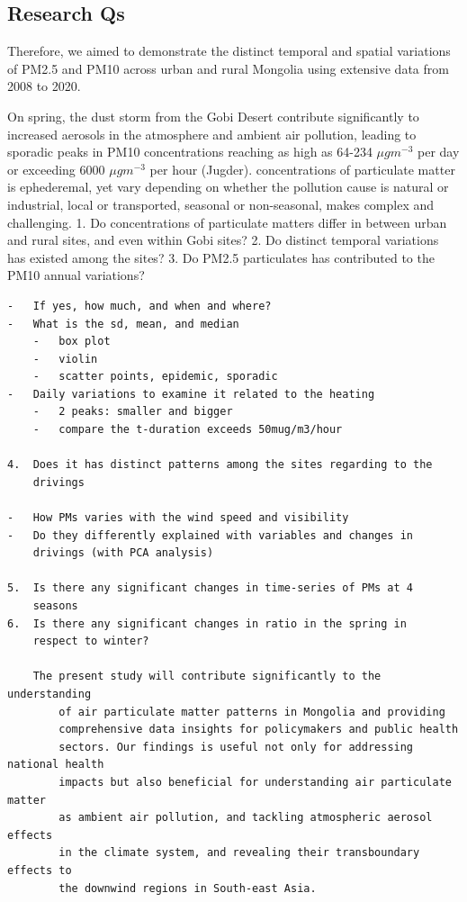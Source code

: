 \documentclass[
  11pt,
]{article}
\begin{document}
\subsection{Research Qs}\label{research-qs}

Therefore, we aimed to demonstrate the distinct temporal and spatial
variations of PM2.5 and PM10 across urban and rural Mongolia using
extensive data from 2008 to 2020.

On spring, the dust storm from the Gobi Desert contribute significantly
to increased aerosols in the atmosphere and ambient air pollution,
leading to sporadic peaks in PM10 concentrations reaching as high as
64-234 \(\mu g m^{-3}\) per day or exceeding 6000 \(\mu g m^{-3}\) per
hour (Jugder). concentrations of particulate matter is ephederemal, yet
vary depending on whether the pollution cause is natural or industrial,
local or transported, seasonal or non-seasonal, makes complex and
challenging. 1. Do concentrations of particulate matters differ in
between urban and rural sites, and even within Gobi sites? 2. Do
distinct temporal variations has existed among the sites? 3. Do PM2.5
particulates has contributed to the PM10 annual variations?

\begin{verbatim}
-   If yes, how much, and when and where?
-   What is the sd, mean, and median
    -   box plot
    -   violin
    -   scatter points, epidemic, sporadic
-   Daily variations to examine it related to the heating
    -   2 peaks: smaller and bigger
    -   compare the t-duration exceeds 50mug/m3/hour

4.  Does it has distinct patterns among the sites regarding to the
    drivings

-   How PMs varies with the wind speed and visibility
-   Do they differently explained with variables and changes in
    drivings (with PCA analysis)

5.  Is there any significant changes in time-series of PMs at 4
    seasons
6.  Is there any significant changes in ratio in the spring in
    respect to winter?

    The present study will contribute significantly to the understanding
        of air particulate matter patterns in Mongolia and providing
        comprehensive data insights for policymakers and public health
        sectors. Our findings is useful not only for addressing national health
        impacts but also beneficial for understanding air particulate matter
        as ambient air pollution, and tackling atmospheric aerosol effects
        in the climate system, and revealing their transboundary effects to
        the downwind regions in South-east Asia.
\end{verbatim}
\end{document}
